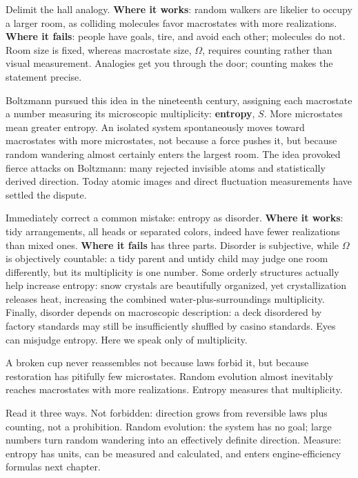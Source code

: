 Delimit the hall analogy. \textbf{Where it works}: random walkers are likelier to occupy a larger room, as colliding molecules favor macrostates with more realizations. \textbf{Where it fails}: people have goals, tire, and avoid each other; molecules do not. Room size is fixed, whereas macrostate size, \(\Omega\), requires counting rather than visual measurement. Analogies get you through the door; counting makes the statement precise.

Boltzmann pursued this idea in the nineteenth century, assigning each macrostate a number measuring its microscopic multiplicity: \textbf{entropy}, \(S\). More microstates mean greater entropy. An isolated system spontaneously moves toward macrostates with more microstates, not because a force pushes it, but because random wandering almost certainly enters the largest room. The idea provoked fierce attacks on Boltzmann: many rejected invisible atoms and statistically derived direction. Today atomic images and direct fluctuation measurements have settled the dispute.

Immediately correct a common mistake: entropy as disorder. \textbf{Where it works}: tidy arrangements, all heads or separated colors, indeed have fewer realizations than mixed ones. \textbf{Where it fails} has three parts. Disorder is subjective, while \(\Omega\) is objectively countable: a tidy parent and untidy child may judge one room differently, but its multiplicity is one number. Some orderly structures actually help increase entropy: snow crystals are beautifully organized, yet crystallization releases heat, increasing the combined water-plus-surroundings multiplicity. Finally, disorder depends on macroscopic description: a deck disordered by factory standards may still be insufficiently shuffled by casino standards. Eyes can misjudge entropy. Here we speak only of multiplicity.


\begin{oneline}
A broken cup never reassembles not because laws forbid it, but because restoration has pitifully few microstates. Random evolution almost inevitably reaches macrostates with more realizations. Entropy measures that multiplicity.
\end{oneline}

Read it three ways. Not forbidden: direction grows from reversible laws plus counting, not a prohibition. Random evolution: the system has no goal; large numbers turn random wandering into an effectively definite direction. Measure: entropy has units, can be measured and calculated, and enters engine-efficiency formulas next chapter.

